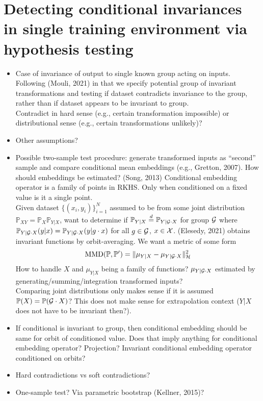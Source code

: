 \documentclass[10pt]{article}
\begin{document}
\section{Detecting conditional invariances in single training environment via hypothesis testing}

\begin{itemize}

\item
Case of invariance of output to single known group acting on inputs. Following (Mouli, 2021) in that we specify potential group of invariant transformations and testing if dataset contradicts invariance to the group, rather than if dataset appears to be invariant to group.
\\

\todo Contradict in hard sense (e.g., certain transformation impossible) or distributional sense (e.g., certain transformations unlikely)?

\item
Other assumptions?

\item
Possible two-sample test procedure: generate transformed inputs as ``second'' sample and compare conditional mean embeddings (e.g., Gretton, 2007). How should embeddings be estimated? (Song, 2013) Conditional embedding operator is a family of points in RKHS. Only when conditioned on a fixed value is it a single point.
\\

Given dataset $\{(x_i,y_i)\}_{i=1}^N$ assumed to be from some joint distribution $\mathbb{P}_{XY}=\mathbb{P}_X\mathbb{P}_{Y|X}$, want to determine if $\mathbb{P}_{Y|X}\overset{d}{=}\mathbb{P}_{Y|\mathcal{G}\cdot X}$ for group $\mathcal{G}$ where $\mathbb{P}_{Y|\mathcal{G}\cdot X}(y|x)=\mathbb{P}_{Y|\mathcal{G}\cdot X}(y|g\cdot x)$ for all $g\in\mathcal{G}$, $x\in\mathcal{X}$. (Elesedy, 2021) obtains invariant functions by orbit-averaging. We want a metric of some form \todo
\[
\mathrm{MMD}(\mathbb{P},\mathbb{P}') = \|\mu_{Y|X} - \mu_{Y|\mathcal{G}\cdot X}\|_\mathcal{H}^2
\]
How to handle $X$ and $\mu_{Y|X}$ being a family of functions? $\mu_{Y|\mathcal{G}\cdot X}$ estimated by generating/summing/integration transformed inputs?
\\

Comparing joint distributions only makes sense if it is assumed $\mathbb{P}(X)=\mathbb{P}(\mathcal{G}\cdot X)$? This does not make sense for extrapolation context ($Y|X$ does not have to be invariant then?).

\item
If conditional is invariant to group, then conditional embedding should be same for orbit of conditioned value. Does that imply anything for conditional embedding operator? Projection? Invariant conditional embedding operator conditioned on orbits?

\item
Hard contradictions vs soft contradictions?

\item
One-sample test? Via parametric bootstrap (Kellner, 2015)?

\end{itemize}
\end{document}
